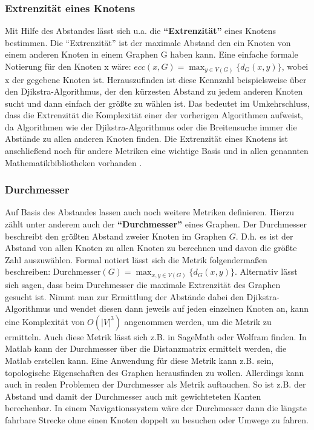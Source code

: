 \documentclass[a4paper,12pt,ngerman,chapterprefix=false,listof=totoc,bibliography=totoc]{scrreprt}
\begin{document}
{\subsubsection*{Extrenzität eines Knotens}
{
Mit Hilfe des Abstandes lässt sich u.a. die \textbf{"`Extrenzität"'} eines Knotens bestimmen. Die "`Extrenzität"' ist der maximale Abstand den ein Knoten von einem anderen Knoten in einem Graphen G haben kann. Eine einfache formale Notierung für den Knoten x wäre: \(ecc(x, G)=\max_{y\in V(G)}\{d_G(x,y)\}\), wobei x der gegebene Knoten ist. \cite{harary_graph_2001} Herauszufinden ist diese Kennzahl beispielsweise über den Djikstra-Algorithmus, der den kürzesten Abstand zu jedem anderen Knoten sucht und dann einfach der größte zu wählen ist. Das bedeutet im Umkehrschluss, dass die Extrenzität die Komplexität einer der vorherigen Algorithmen aufweist, da Algorithmen wie der Djikstra-Algorithmus oder die Breitensuche immer die Abstände zu allen anderen Knoten finden. Die Extrenzität eines Knotens ist anschließend noch für andere Metriken eine wichtige Basis und in allen genannten Mathematikbibliotheken vorhanden \cite{sagemath_graph_2020,matlab_shortest_2020,wolfram_graph_2020}.
}
\subsubsection*{Durchmesser}
{
Auf Basis des Abstandes lassen auch noch weitere Metriken definieren. Hierzu zählt unter anderem auch der \textbf{"`Durchmesser"'} eines Graphen. Der Durchmesser beschreibt den größten Abstand zweier Knoten im Graphen \(G\). \cite{diestel_graphentheorie_2000} D.h. es ist der Abstand von allen Knoten zu allen Knoten zu berechnen und davon die größte Zahl auszuwählen. Formal notiert lässt sich die Metrik folgendermaßen beschreiben: \(\text{Durchmesser}(G)=\max_{x,y\in V(G)}\{ d_G (x,y)\}\). Alternativ lässt sich sagen, dass beim Durchmesser die maximale Extrenzität des Graphen gesucht ist. Nimmt man zur Ermittlung der Abstände dabei den Djikstra-Algorithmus und wendet diesen dann jeweils auf jeden einzelnen Knoten an, kann eine Komplexität von \(O(\vert V\vert ^3)\) angenommen werden, um die Metrik zu ermitteln. Auch diese Metrik lässt sich z.B. in SageMath oder Wolfram finden. In Matlab kann der Durchmesser über die Distanzmatrix ermittelt werden, die Matlab erstellen kann. \cite{sagemath_graph_2020,matlab_shortest_2020,wolfram_graph_2020} Eine Anwendung für diese Metrik kann z.B. sein, topologische Eigenschaften des Graphen herausfinden zu wollen. Allerdings kann auch in realen Problemen der Durchmesser als Metrik auftauchen. So ist z.B. der Abstand und damit der Durchmesser auch mit gewichteteten Kanten berechenbar. \cite{sagemath_graph_2020,gitta_durchmesser_2014} In einem Navigationssystem wäre der Durchmesser dann die längste fahrbare Strecke ohne einen Knoten doppelt zu besuchen oder Umwege zu fahren.
}
}
\end{document}
